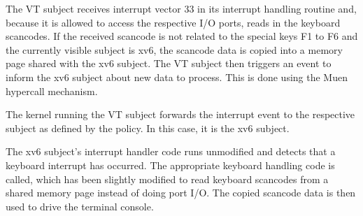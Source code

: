 The VT subject receives interrupt vector 33 in its interrupt handling routine
and, because it is allowed to access the respective I/O ports, reads in the
keyboard scancodes. If the received scancode is not related to the special keys
F1 to F6 and the currently visible subject is xv6, the scancode data is copied
into a memory page shared with the xv6 subject. The VT subject then triggers an
event to inform the xv6 subject about new data to process. This is done using
the Muen hypercall mechanism.

The kernel running the VT subject forwards the interrupt event to the respective
subject as defined by the policy. In this case, it is the xv6 subject.

The xv6 subject's interrupt handler code runs unmodified and detects that a
keyboard interrupt has occurred. The appropriate keyboard handling code is
called, which has been slightly modified to read keyboard scancodes from a
shared memory page instead of doing port I/O. The copied scancode data is then
used to drive the terminal console.
